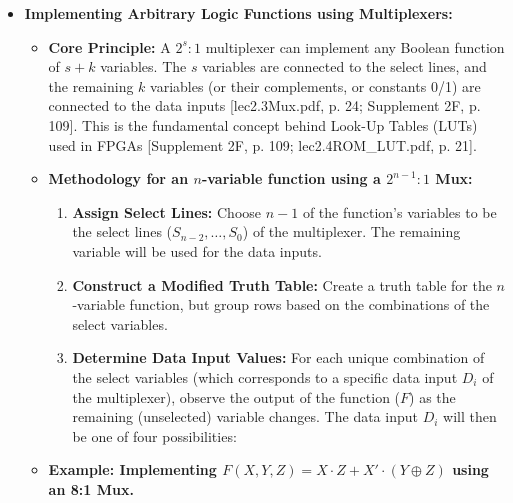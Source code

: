 \documentclass{article}
\begin{document}
\begin{itemize}
    \item \textbf{Implementing Arbitrary Logic Functions using Multiplexers:}
    \begin{itemize}
        \item \textbf{Core Principle:} A $2^s:1$ multiplexer can implement any Boolean function of $s+k$ variables. The $s$ variables are connected to the select lines, and the remaining $k$ variables (or their complements, or constants 0/1) are connected to the data inputs [lec2.3Mux.pdf, p. 24; Supplement 2F, p. 109]. This is the fundamental concept behind Look-Up Tables (LUTs) used in FPGAs [Supplement 2F, p. 109; lec2.4ROM\_LUT.pdf, p. 21].
        \item \textbf{Methodology for an $n$-variable function using a $2^{n-1}:1$ Mux:}
        \begin{enumerate}
            \item \textbf{Assign Select Lines:} Choose $n-1$ of the function's variables to be the select lines ($S_{n-2}, \ldots, S_0$) of the multiplexer. The remaining variable will be used for the data inputs.
            \item \textbf{Construct a Modified Truth Table:} Create a truth table for the $n$-variable function, but group rows based on the combinations of the select variables.
            \item \textbf{Determine Data Input Values:} For each unique combination of the select variables (which corresponds to a specific data input $D_i$ of the multiplexer), observe the output of the function ($F$) as the remaining (unselected) variable changes. The data input $D_i$ will then be one of four possibilities:
        \end{enumerate}
        \item \textbf{Example: Implementing $F(X,Y,Z) = X \cdot Z + X' \cdot (Y \oplus Z)$ using an 8:1 Mux.}

\end{itemize}
\end{itemize}
\end{document}
